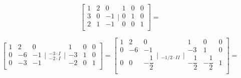 $$
\left[
\begin{array}{rrr}
  1 & 2 &  0 \\
  3 & 0 & -1 \\
  2 & 1 & -1 \\
\end{array} \Bigg| \begin{array}{ccc}
  1 & 0 & 0 \\
  0 & 1 & 0 \\
  0 & 0 & 1 \\
\end{array} \right] =
$$

$$
\left[
\begin{array}{rrr}
  1 & 2 &  0 \\
  0 & -6 & -1 \\
  0 & -3 & -1 \\
\end{array} \Bigg|
\begin{array}{ccc}
  _{} \\
  _{-3\cdot{I}} \\
  _{-2\cdot{I}} \\
\end{array}
\Bigg| \begin{array}{rrr}
  1 & 0 & 0 \\
  -3 & 1 & 0 \\
  -2 & 0 & 1 \\
\end{array} \right]= \left[
\begin{array}{rrr}
  1 & 2 &  0 \\
  0 & -6 & -1 \\
  0 & 0 & -\dfrac{1}{2} \\
\end{array} \Bigg|
\begin{array}{ccc}
  _{} \\
  _{} \\
  _{-1/2 \cdot {II}} \\
\end{array}
\Bigg| \begin{array}{rrr}
  1 & 0 & 0 \\
  -3 & 1 & 0 \\
  -\dfrac{1}{2} & -\dfrac{1}{2} & 1 \\
\end{array} \right] =
$$

